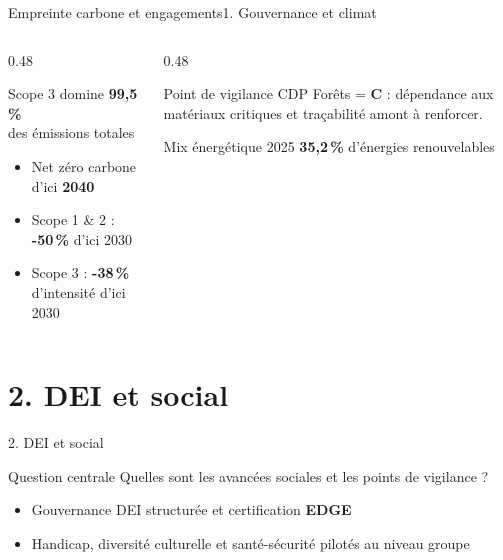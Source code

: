 \documentclass[aspectratio=169,french,12pt]{beamer}
\begin{document}
\begin{frame}{Empreinte carbone et engagements}{1. Gouvernance et climat}
\begin{columns}[T]
  \begin{column}{0.48\textwidth}
    \begin{block}{Scope 3 domine}
      \centering
      \huge \textbf{99,5\,\%}\normalsize\\[0.2cm]
      des émissions totales
    \end{block}
    \begin{itemize}
      \item Net zéro carbone d'ici \textbf{2040}
      \item Scope 1 \& 2 : \textbf{-50\,\%} d'ici 2030
      \item Scope 3 : \textbf{-38\,\%} d'intensité d'ici 2030
    \end{itemize}
  \end{column}
  \begin{column}{0.48\textwidth}
    \begin{alertblock}{Point de vigilance}
      CDP Forêts = \textbf{C} : dépendance aux matériaux critiques et traçabilité amont à renforcer.
    \end{alertblock}
    \begin{block}{Mix énergétique 2025}
      \textbf{35,2\,\%} d'énergies renouvelables
    \end{block}
  \end{column}
\end{columns}
\end{frame}

\section{2. DEI et social}

\begin{frame}{2. DEI et social}
\begin{block}{Question centrale}
Quelles sont les avancées sociales et les points de vigilance ?
\end{block}
\vfill
\begin{itemize}
  \item Gouvernance DEI structurée et certification \textbf{EDGE}
  \item Handicap, diversité culturelle et santé-sécurité pilotés au niveau groupe
\end{itemize}
\end{frame}
\end{document}
